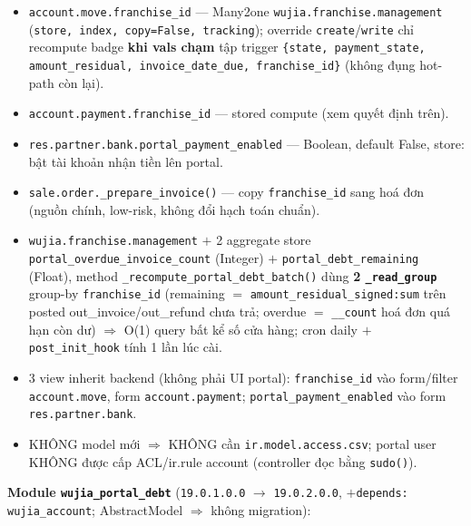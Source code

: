 \begin{itemize}
  \item \texttt{account.move.franchise\_id} --- Many2one \texttt{wujia.franchise.management}
    (\texttt{store, index, copy=False, tracking}); override \texttt{create}/\texttt{write} chỉ
    recompute badge \textbf{khi vals chạm} tập trigger
    \texttt{\{state, payment\_state, amount\_residual, invoice\_date\_due, franchise\_id\}}
    (không đụng hot-path còn lại).
  \item \texttt{account.payment.franchise\_id} --- stored compute (xem quyết định trên).
  \item \texttt{res.partner.bank.portal\_payment\_enabled} --- Boolean, default False, store:
    bật tài khoản nhận tiền lên portal.
  \item \texttt{sale.order.\_prepare\_invoice()} --- copy \texttt{franchise\_id} sang hoá đơn
    (nguồn chính, low-risk, không đổi hạch toán chuẩn).
  \item \texttt{wujia.franchise.management} $+$ 2 aggregate store
    \texttt{portal\_overdue\_invoice\_count} (Integer) $+$ \texttt{portal\_debt\_remaining}
    (Float), method \texttt{\_recompute\_portal\_debt\_batch()} dùng \textbf{2 \texttt{\_read\_group}}
    group-by \texttt{franchise\_id} (remaining $=$ \texttt{amount\_residual\_signed:sum} trên
    posted out\_invoice/out\_refund chưa trả; overdue $=$ \texttt{\_\_count} hoá đơn quá hạn còn
    dư) $\Rightarrow$ O(1) query bất kể số cửa hàng; cron daily $+$ \texttt{post\_init\_hook}
    tính 1 lần lúc cài.
  \item 3 view inherit backend (không phải UI portal): \texttt{franchise\_id} vào form/filter
    \texttt{account.move}, form \texttt{account.payment}; \texttt{portal\_payment\_enabled} vào
    form \texttt{res.partner.bank}.
  \item KHÔNG model mới $\Rightarrow$ KHÔNG cần \texttt{ir.model.access.csv}; portal user KHÔNG
    được cấp ACL/ir.rule account (controller đọc bằng \texttt{sudo()}).
\end{itemize}

\textbf{Module \texttt{wujia\_portal\_debt}} (\texttt{19.0.1.0.0} $\to$ \texttt{19.0.2.0.0},
$+$\texttt{depends: wujia\_account}; AbstractModel $\Rightarrow$ không migration):

